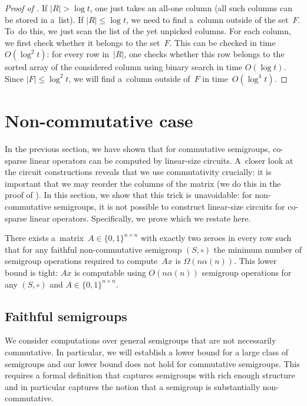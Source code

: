 \begin{proof}[Proof of {}]
    If $|R| > \log t$, one just takes an all-one column (all such columns
    can be stored in a~list). If $|R| \le \log t$, we need to find a~column outside
    of the set~$F$. To~do this, we just scan the list of the yet unpicked columns. For
    each column, we first check whether it belongs to the set~$F$. This can be
    checked in time $O(\log^2t)$: for every row in~$|R|$, one checks whether this
    row belongs to the sorted array of the considered column using binary search in
    time $O(\log t)$. Since $|F| \le \log^2t$, we will find a~column outside of~$F$
    in time~$O(\log^4 t)$.

\end{proof}


\section{Non-commutative case}
\label{sec-non-commutative}

In the previous section, we have shown that for commutative semigroups,
%
%
%
co-sparse
linear operators can be computed by linear-size circuits. A~closer look at the
circuit constructions reveals that we use commutativity crucially: it is
important that we may reorder the columns of the matrix (we do this in the proof
of ). In this section, we show that this trick is
unavoidable: for non-commutative semigroups, it is not possible to construct
linear-size circuits for
%
%
co-sparse
linear operators. %
Specifically,  %
we prove 
which we restate here.  %


%
\begin{theorem}
    \label{thm:lowerbound}
    There exists
    a~matrix~$A \in \{0,1\}^{n \times n}$ with exactly two zeroes
    in every row such that for any faithful non-commutative semigroup $(S, \circ)$
    the minimum number of semigroup operations required to compute~$Ax$ is
    $\Omega(n\alpha(n))$.
    This lower bound is tight: $Ax$ is computable using $O(n\alpha(n))$ semigroup
    operations for any $(S, \circ)$ and $A\in \{0,1\}^{n \times n}$.
\end{theorem}

\subsection{Faithful semigroups}

We consider computations over general semigroups that are not necessarily
commutative. In particular, we will establish a lower bound for a large class of
semigroups and our lower bound does not hold for commutative semigroups. This
requires a formal definition that captures semigroups with rich enough structure
and in particular %
%
captures the notion   %
that a semigroup is substantially non-commutative.

